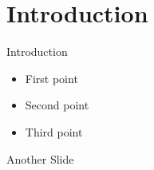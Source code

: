\section{Introduction} \label{sec:introduction}

\begin{frame}{Introduction}
    \begin{itemize}
        \item First point
        \item Second point
        \item Third point
    \end{itemize}
\end{frame}

\begin{frame}{Another Slide}
    
\end{frame}
